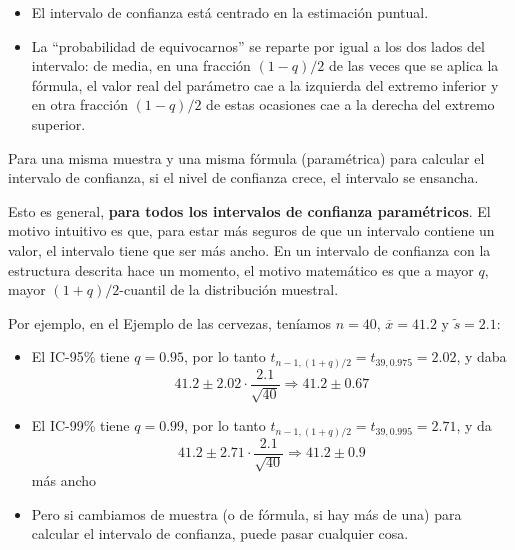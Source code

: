 \documentclass[
  spanish,
  letterpaper,
  DIV=11,
  numbers=noendperiod]{scrreprt}
\begin{document}
\begin{itemize}
\item
  El intervalo de confianza está centrado en la estimación puntual.
\item
  La ``probabilidad de equivocarnos'' se reparte por igual a los dos
  lados del intervalo: de media, en una fracción \((1-q)/2\) de las
  veces que se aplica la fórmula, el valor real del parámetro cae a la
  izquierda del extremo inferior y en otra fracción \((1-q)/2\) de estas
  ocasiones cae a la derecha del extremo superior.
\end{itemize}

\begin{tcolorbox}[enhanced jigsaw, arc=.35mm, bottomrule=.15mm, bottomtitle=1mm, breakable, colback=white, colbacktitle=quarto-callout-warning-color!10!white, colframe=quarto-callout-warning-color-frame, coltitle=black, left=2mm, leftrule=.75mm, opacityback=0, opacitybacktitle=0.6, rightrule=.15mm, title=\textcolor{quarto-callout-warning-color}{\faExclamationTriangle}\hspace{0.5em}{Advertencia}, titlerule=0mm, toprule=.15mm, toptitle=1mm]

Para una misma muestra y una misma fórmula (paramétrica) para calcular
el intervalo de confianza, si el nivel de confianza crece, el intervalo
se ensancha.

\end{tcolorbox}

Esto es general, \textbf{para todos los intervalos de confianza
paramétricos}. El motivo intuitivo es que, para estar más seguros de que
un intervalo contiene un valor, el intervalo tiene que ser más ancho. En
un intervalo de confianza con la estructura descrita hace un momento, el
motivo matemático es que a mayor \(q\), mayor \((1+q)/2\)-cuantil de la
distribución muestral.

Por ejemplo, en el Ejemplo de las cervezas, teníamos \(n=40\),
\(\overline{x}=41.2\) y \(\widetilde{s}=2.1\):

\begin{itemize}
\item
  El IC-95\% tiene \(q=0.95\), por lo tanto
  \(t_{n-1,(1+q)/2}=t_{39,0.975}=2.02\), y daba \[
  41.2\pm 2.02\cdot \frac{2.1}{\sqrt{40}}\Rightarrow 41.2\pm 0.67
  \]
\item
  El IC-99\% tiene \(q=0.99\), por lo tanto
  \(t_{n-1,(1+q)/2}=t_{39,0.995}=2.71\), y da \[
  41.2\pm 2.71\cdot \frac{2.1}{\sqrt{40}}\Rightarrow 41.2\pm 0.9
  \] más ancho
\item
  Pero si cambiamos de muestra (o de fórmula, si hay más de una) para
  calcular el intervalo de confianza, puede pasar cualquier cosa.
\end{itemize}
\end{document}

